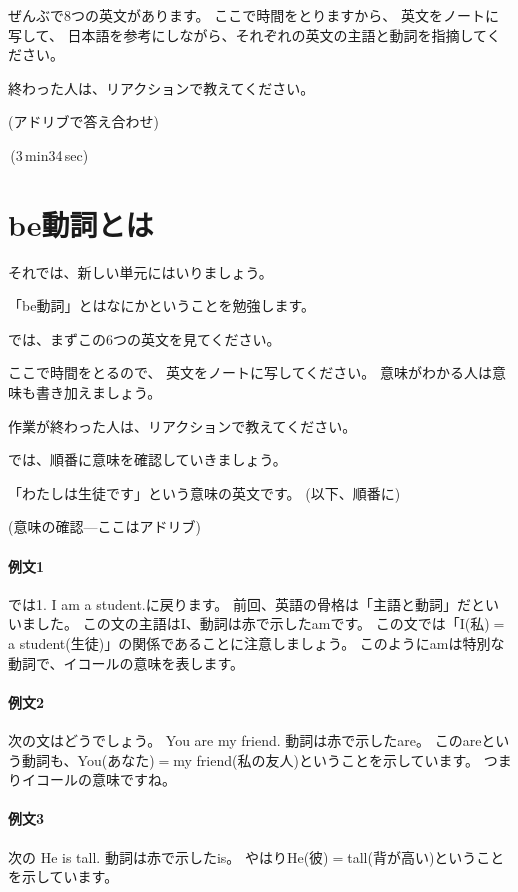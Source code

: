 \documentclass[book,jafontscale=0.9247]{jlreq}
\newcommand{\mySagyo}{%
\begin{minipage}[t]{.98\textwidth}
\mbox{}\hrulefill\mbox{}\par%
\mbox{}\hfill{}\raisebox{-5pt}{作業}\hfill\mbox{}\par%
\mbox{}\hrulefill\mbox{}
\end{minipage}%
\par%
\bigskip
}
\begin{document}
ぜんぶで8つの英文があります。
ここで時間をとりますから、
英文をノートに写して、
日本語を参考にしながら、それぞれの英文の主語と動詞を指摘してください。

終わった人は、リアクションで教えてください。

\mySagyo

(アドリブで答え合わせ)

\faVolumeUp\,(3\,min34\,sec)

{\large \ComputerMouse}


\newpage
\section{be動詞とは}
それでは、新しい単元にはいりましょう。

「be動詞」とはなにかということを勉強します。

{\large \ComputerMouse}

では、まずこの6つの英文を見てください。

ここで時間をとるので、
英文をノートに写してください。
意味がわかる人は意味も書き加えましょう。

作業が終わった人は、リアクションで教えてください。

\mySagyo

では、順番に意味を確認していきましょう。

「わたしは生徒です」という意味の英文です。
(以下、順番に)


(意味の確認---ここはアドリブ)

\paragraph{例文1}
では1. I am a student.に戻ります。
前回、英語の骨格は「主語と動詞」だといいました。
この文の主語はI、動詞は赤で示したamです。
この文では「I(私)$=$a student(生徒)」の関係であることに注意しましょう。
このようにamは特別な動詞で、イコールの意味を表します。

\paragraph{例文2}
次の文はどうでしょう。
You are my friend.
動詞は赤で示したare。
このareという動詞も、You(あなた)$=$my friend(私の友人)ということを示しています。
つまりイコールの意味ですね。

\paragraph{例文3}
次の
 He is tall.
動詞は赤で示したis。
やはりHe(彼)$=$tall(背が高い)ということを示しています。
\end{document}
